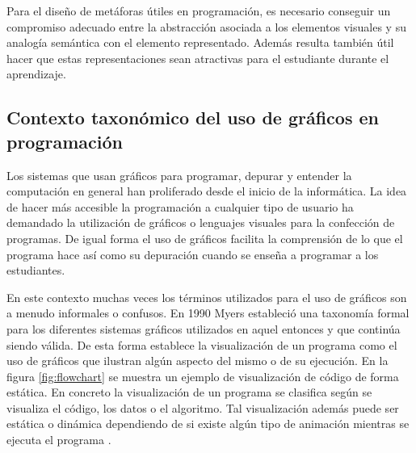 \documentclass{llncs}
\begin{document}
Para el diseño de metáforas útiles en programación, es necesario conseguir un compromiso adecuado entre la abstracción asociada a los elementos visuales y su analogía semántica con el elemento representado. Además resulta también útil hacer que estas representaciones sean atractivas para el estudiante durante el aprendizaje. 


\subsection{Contexto taxonómico del uso de gráficos en programación}
\label{subsec:taxonomy}
Los sistemas que usan gráficos para programar, depurar y entender la computación en general han proliferado desde el inicio de la informática. La idea de hacer más accesible la programación a cualquier tipo de usuario ha demandado la utilización de gráficos o lenguajes visuales para la confección de programas. De igual forma el uso de gráficos facilita la comprensión de lo que el programa hace así como su depuración cuando se enseña a programar a los estudiantes. 

En este contexto muchas veces los términos utilizados para el uso de gráficos son a menudo informales o confusos. En 1990 Myers \cite{myers1990taxonomies} estableció una taxonomía formal para los diferentes sistemas gráficos utilizados en aquel entonces y que continúa siendo válida. De esta forma establece la visualización de un programa como el uso de gráficos que ilustran algún aspecto del mismo o de su ejecución. En la figura \ref{fig:flowchart} se muestra un ejemplo de visualización de código de forma estática. En concreto la visualización de un programa se clasifica según se visualiza el código, los datos o el algoritmo. Tal visualización además puede ser estática o dinámica dependiendo de si existe algún tipo de animación mientras se ejecuta el programa \cite{urquiza2009survey}. 
\end{document}
